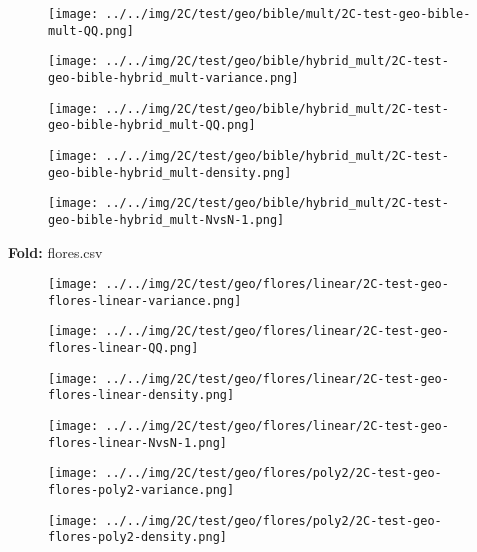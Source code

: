 \begin{figure}[H]
\centering	\texttt{[image: ../../img/2C/test/geo/bible/mult/2C-test-geo-bible-mult-QQ.png]}
\end{figure}
\begin{figure}[H]
\centering	\texttt{[image: ../../img/2C/test/geo/bible/hybrid\_mult/2C-test-geo-bible-hybrid\_mult-variance.png]}
\end{figure}
\begin{figure}[H]
\centering	\texttt{[image: ../../img/2C/test/geo/bible/hybrid\_mult/2C-test-geo-bible-hybrid\_mult-QQ.png]}
\end{figure}
\begin{figure}[H]
\centering	\texttt{[image: ../../img/2C/test/geo/bible/hybrid\_mult/2C-test-geo-bible-hybrid\_mult-density.png]}
\end{figure}
\begin{figure}[H]
\centering	\texttt{[image: ../../img/2C/test/geo/bible/hybrid\_mult/2C-test-geo-bible-hybrid\_mult-NvsN-1.png]}
\end{figure}
\textbf{Fold:} flores.csv
\begin{figure}[H]
\centering	\texttt{[image: ../../img/2C/test/geo/flores/linear/2C-test-geo-flores-linear-variance.png]}
\end{figure}
\begin{figure}[H]
\centering	\texttt{[image: ../../img/2C/test/geo/flores/linear/2C-test-geo-flores-linear-QQ.png]}
\end{figure}
\begin{figure}[H]
\centering	\texttt{[image: ../../img/2C/test/geo/flores/linear/2C-test-geo-flores-linear-density.png]}
\end{figure}
\begin{figure}[H]
\centering	\texttt{[image: ../../img/2C/test/geo/flores/linear/2C-test-geo-flores-linear-NvsN-1.png]}
\end{figure}
\begin{figure}[H]
\centering	\texttt{[image: ../../img/2C/test/geo/flores/poly2/2C-test-geo-flores-poly2-variance.png]}
\end{figure}
\begin{figure}[H]
\centering	\texttt{[image: ../../img/2C/test/geo/flores/poly2/2C-test-geo-flores-poly2-density.png]}
\end{figure}
